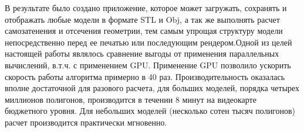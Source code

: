 \clearpage
{}
В результате было создано приложение, которое может загружать, сохранять и отображать любые модели в формате STL и Obj, а так же выполнять расчет самозатенения и отсечения геометрии, тем самым упрощая структуру модели непосредственно перед ее печатью или последующим рендером.Одной из целей настоящей работы являлось сравнение выгоды от применения параллельных вычислений, в.т.ч. с применением GPU. Применение GPU позволило ускорить скорость работы алгоритма примерно в 40 раз. Производительность оказалась вполне достаточной для разового расчета, для больших моделей, порядка четырех миллионов полигонов, производится в течении 8 минут на видеокарте бюджетного уровня. Для небольших моделей (несколько сотен тысяч полигонов) расчет производится практически мгновенно.